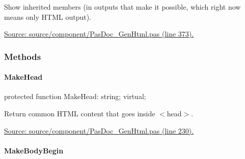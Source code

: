 \documentclass{report}
\newif\ifpdf
\begin{document}
\begin{list}{}
\begin{flushleft}
\ifpdf
\end{flushleft}
\fi


\par Show inherited members (in outputs that make it possible, which right now means only HTML output).\par
\href{https://github.com/pasdoc/pasdoc/blob/master/source/component/PasDoc_GenHtml.pas#L373}{Source: source/component/PasDoc{\_}GenHtml.pas (line 373).}\end{list}
\subsubsection*{\large{\textbf{Methods}}\normalsize\hspace{1ex}\hfill}
\paragraph*{MakeHead}\hspace*{\fill}

\label{PasDoc_GenHtml.TGenericHTMLDocGenerator-MakeHead}
\begin{list}{}{
\setlength{\itemindent}{0cm}
\setlength{\listparindent}{0cm}
\setlength{\leftmargin}{\evensidemargin}
\addtolength{\leftmargin}{\tmplength}
\settowidth{\labelsep}{X}
\addtolength{\leftmargin}{\labelsep}
\setlength{\labelwidth}{\tmplength}
}
\item[\textbf{Declaration}\hfill]
\ifpdf
\begin{flushleft}
\fi
\begin{ttfamily}
protected function MakeHead: string; virtual;\end{ttfamily}

\ifpdf
\end{flushleft}
\fi

\par
\item[\textbf{Description}]
Return common HTML content that goes inside {$<$}head{$>$}.\par
\href{https://github.com/pasdoc/pasdoc/blob/master/source/component/PasDoc_GenHtml.pas#L230}{Source: source/component/PasDoc{\_}GenHtml.pas (line 230).}

\end{list}
\paragraph*{MakeBodyBegin}\hspace*{\fill}
\end{document}
